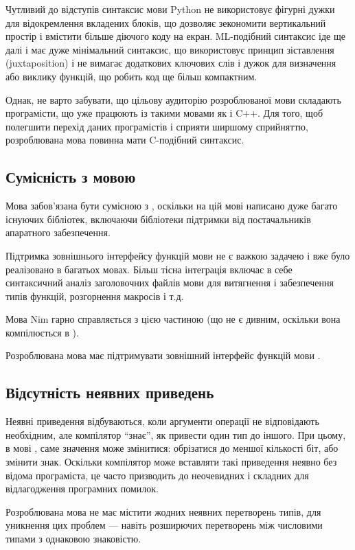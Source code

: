 \documentclass[main.tex]{subfiles}
\begin{document}
Чутливий до відступів синтаксис мови Python не використовує фігурні дужки для відокремлення вкладених блоків, що дозволяє зекономити вертикальний простір і вмістити більше діючого коду на екран. ML-подібний синтаксис іде ще далі і має дуже мінімальний синтаксис, що використовує принцип зіставлення (juxtaposition) і не вимагає додаткових ключових слів і дужок для визначення або виклику функцій, що робить код ще більш компактним.

Однак, не варто забувати, що цільову аудиторію розроблюваної мови складають програмісти, що уже працюють із такими мовами як \LangC{} і C++. Для того, щоб полегшити перехід даних програмістів і сприяти ширшому сприйняттю, розроблювана мова повинна мати C-подібний синтаксис.

\subsection{Сумісність з мовою \LangC{}}
Мова забов'язана бути сумісною з \LangC{}, оскільки на цій мові написано дуже багато існуючих бібліотек, включаючи бібліотеки підтримки від постачальників апаратного забезпечення.

Підтримка зовнішнього інтерфейсу функцій мови \LangC{} не є важкою задачею і вже було реалізовано в багатьох мовах.
Більш тісна інтеграція включає в себе синтаксичний аналіз заголовочних файлів мови \LangC{} для витягнення і забезпечення типів функцій, розгорнення макросів і т.д.

Мова Nim гарно справляється з цією частиною (що не є дивним, оскільки вона компілюється в \LangC{}).

Розроблювана мова має підтримувати зовнішний інтерфейс функцій мови \LangC{}.

\subsection{Відсутність неявних приведень}
Неявні приведення відбуваються, коли аргументи операції не відповідають необхідним, але компілятор ``знає'', як привести один тип до іншого. При цьому, в мові \LangC{}, саме значення може змінитися: обрізатися до меншої кількості біт, або змінити знак. Оскільки компілятор може вставляти такі приведення неявно без відома програміста, це часто призводить до неочевидних і складних для відлагодження програмних помилок.

Розроблювана мова не має містити жодних неявних перетворень типів, для уникнення цих проблем --- навіть розширючих перетворень між числовими типами з однаковою знаковістю.
\end{document}
